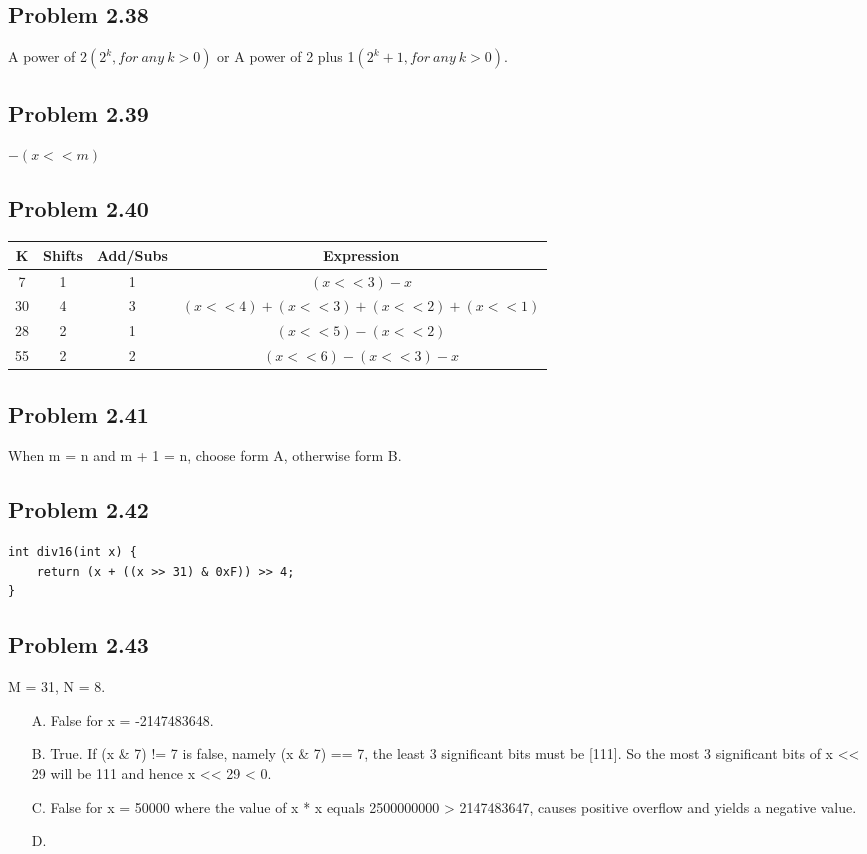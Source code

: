 \documentclass[a4paper]{article}
\begin{document}
\subsection*{Problem 2.38}
A power of 2$(2^k, for\ any\ k > 0)$ or A power of 2 plus 1$(2^k+1, for\ any\ k > 0)$.

\subsection*{Problem 2.39}
$-(x<<m)$

\subsection*{Problem 2.40}
\begin{tabular}{cccc}
    K&Shifts&Add/Subs&Expression\\
    \hline
    7&1&1&$(x<<3)-x$\\
    30&4&3&$(x<<4)+(x<<3)+(x<<2)+(x<<1)$\\
    28&2&1&$(x<<5)-(x<<2)$\\
    55&2&2&$(x<<6)-(x<<3)-x$\\
\end{tabular}

\subsection*{Problem 2.41}
When m = n and m + 1 = n, choose form A, otherwise form B.

\subsection*{Problem 2.42}
\begin{lstlisting}
int div16(int x) {
    return (x + ((x >> 31) & 0xF)) >> 4;
}
\end{lstlisting}

\subsection*{Problem 2.43}
M = 31, N = 8.

\begin{enumerate}
    \item [A.] False for x = -2147483648.
    \item [B.] True. If (x \& 7) != 7 is false, namely (x 
    \& 7) == 7, the least 3 significant bits must be [111]. So the most 3 significant bits of x << 29 will be 111 and hence x << 29 < 0.
    \item [C.] False for x = 50000 where the value of x * x equals 2500000000 > 2147483647, causes positive overflow and yields a negative value.
    \item [D.] 
\end{enumerate}
\end{document}
